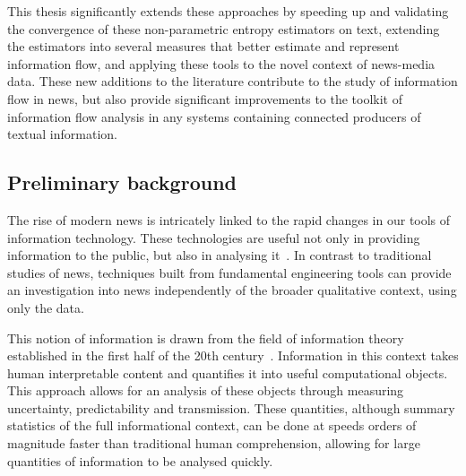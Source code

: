 This thesis significantly extends these approaches by speeding up and validating the convergence of these non-parametric entropy estimators on text, extending the estimators into several measures that better estimate and represent information flow, and applying these tools to the novel context of news-media data. These new additions to the literature contribute to the study of information flow in news, but also provide significant improvements to the toolkit of information flow analysis in any systems containing connected producers of textual information.


\subsection{Preliminary background}

The rise of modern news is intricately linked to the rapid changes in our tools of information technology. These technologies are useful not only in providing information to the public, but also in analysing it~\cite{shannon_mathematical_1948,cover_elements_2012}. In contrast to traditional studies of news, techniques built from fundamental engineering tools can provide an investigation into news independently of the broader qualitative context, using only the data.   

This notion of information is drawn from the field of information theory established in the first half of the 20th century~\cite{shannon_mathematical_1948,nyquist1924certain,hartley1928transmission}. Information in this context takes human interpretable content and quantifies it into useful computational objects. This approach allows for an analysis of these objects through measuring uncertainty, predictability and transmission. These quantities, although summary statistics of the full informational context, can be done at speeds orders of magnitude faster than traditional human comprehension, allowing for large quantities of information to be analysed quickly. 

